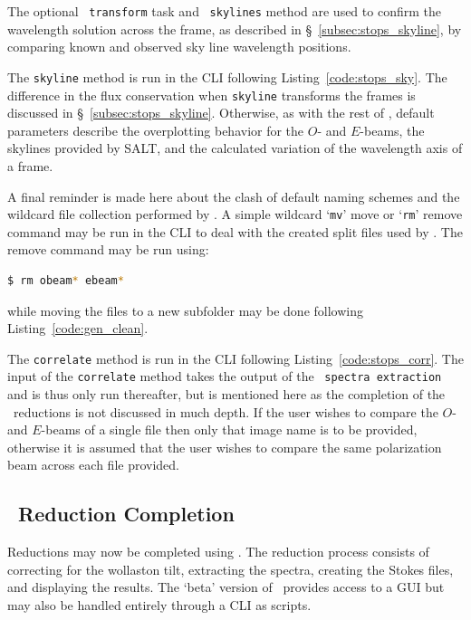 The optional \iraf\ \texttt{transform} task and \stops\ \texttt{skylines} method are used to confirm the wavelength solution across the frame, as described in \S~\ref{subsec:stops_skyline}, by comparing known and observed sky line wavelength positions.

The \texttt{skyline} method is run in the \gls{CLI} following Listing~\ref{code:stops_sky}. The difference in the flux conservation when \texttt{skyline} transforms the frames is discussed in \S~\ref{subsec:stops_skyline}. Otherwise, as with the rest of \stops, default parameters describe the overplotting behavior for the $O$- and $E$-beams, the skylines provided by \gls{SALT}, and the calculated variation of the wavelength axis of a frame.

A final reminder is made here about the clash of default naming schemes and the wildcard file collection performed by \polsalt. A simple wildcard `\texttt{mv}' move or `\texttt{rm}' remove command may be run in the \gls{CLI} to deal with the created split files used by \iraf. The remove command may be run using:
\begin{lstlisting}[language=bash]
$ rm obeam* ebeam*
\end{lstlisting}
{\parskip=0pt while} moving the files to a new subfolder may be done following Listing~\ref{code:gen_clean}.

The \texttt{correlate} method is run in the \gls{CLI} following Listing~\ref{code:stops_corr}. The input of the \texttt{correlate} method takes the output of the \polsalt\ \texttt{spectra extraction} and is thus only run thereafter, but is mentioned here as the completion of the \polsalt\ reductions is not discussed in much depth. If the user wishes to compare the $O$- and $E$-beams of a single file then only that image name is to be provided, otherwise it is assumed that the user wishes to compare the same polarization beam across each file provided.

\subsection{\polsalt\ Reduction Completion} \label{subsec:reduc_com}

Reductions may now be completed using \polsalt. The reduction process consists of correcting for the wollaston tilt, extracting the spectra, creating the Stokes files, and displaying the results. The `beta' version of \polsalt\ provides access to a \gls{GUI} but may also be handled entirely through a \gls{CLI} as scripts.

